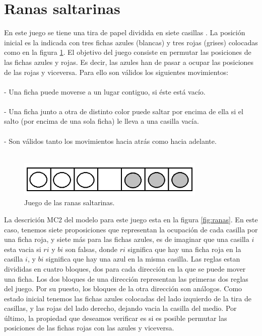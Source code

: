\section{Ranas saltarinas}

En este juego se tiene una tira de papel dividida en siete casillas \cite{Juegos:11}. La posición inicial es la indicada con tres fichas azules (blancas) y tres rojas (grises) colocadas como en la figura \ref{fig:ranasjuego}. El objetivo del juego consiste en permutar las posiciones de las fichas azules y rojas. Es decir, las azules han de pasar a ocupar las posiciones de las rojas y viceversa. Para ello son válidos los siguientes movimientos:\\
\\
- Una ficha puede moverse a un lugar contiguo, si éste está vacío.\\
\\
- Una ficha junto a otra de distinto color puede saltar por encima de ella si el salto (por encima de una sola ficha) le lleva a una casilla vacía.\\
\\
- Son válidos tanto los movimientos hacia atrás como hacia adelante.\\
\\

\begin{figure}[H]
  \centering
  \includegraphics[width=0.8\textwidth]{Figures/ranasjuego.png}
  \caption{Juego de las ranas saltarinas.}
  \label{fig:ranasjuego}
\end{figure}

\noindent La descrición MC2 del modelo para este juego esta en la figura \ref{fig:ranas}. En este caso, tenemos siete proposiciones que representan la ocupación de cada casilla por una ficha roja, y siete más para las fichas azules, es de imaginar que una casilla $i$ esta vacia si $ri$ y $bi$ son falsas, donde $ri$ significa que hay una ficha roja en la casilla $i$, y $bi$ significa que hay una azul en la misma casilla. Las reglas estan divididas en cuatro bloques, dos para cada dirección en la que se puede mover una ficha. Los dos bloques de una dirección representan las primeras dos reglas del juego. Por su puesto, los bloques de la otra dirección son análogos. Como estado inicial tenemos las fichas azules colocadas del lado izquierdo de la tira de casillas, y las rojas del lado derecho, dejando vacia la casilla del medio. Por último, la propiedad que deseamos verificar es si es posible permutar las posiciones de las fichas rojas con las azules y viceversa. 

